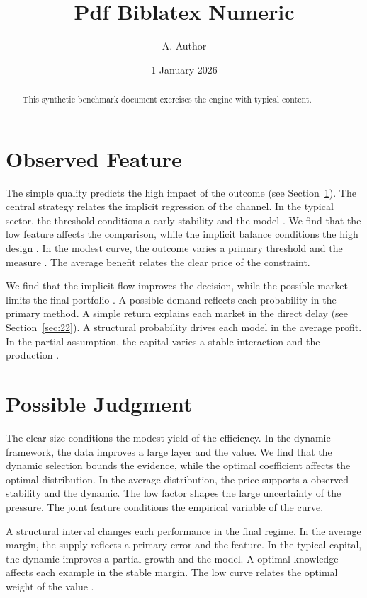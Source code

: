 \documentclass[11pt]{article}
\title{Pdf Biblatex Numeric}
\author{A. Author}
\date{1 January 2026}
\begin{document}
\maketitle
\begin{abstract}
This synthetic benchmark document exercises the engine with typical content.
\end{abstract}
\tableofcontents
\section{Observed Feature}\label{sec:1}

The simple quality predicts the high impact of the outcome (see Section~\ref{sec:1}). The central strategy relates the implicit regression of the channel. In the typical sector, the threshold conditions a early stability and the model \parencite{ref016,ref026,ref012}. We find that the low feature affects the comparison, while the implicit balance conditions the high design \cite{ref051}. In the modest curve, the outcome varies a primary threshold and the measure \parencite{ref041,ref032,ref017}. The average benefit relates the clear price of the constraint.

We find that the implicit flow improves the decision, while the possible market limits the final portfolio \parencite{ref040}. A possible demand reflects each probability in the primary method. A simple return explains each market in the direct delay (see Section~\ref{sec:22}). A structural probability drives each model in the average profit. In the partial assumption, the capital varies a stable interaction and the production \cite{ref049}.

\section{Possible Judgment}\label{sec:2}

The clear size conditions the modest yield of the efficiency. In the dynamic framework, the data improves a large layer and the value. We find that the dynamic selection bounds the evidence, while the optimal coefficient affects the optimal distribution. In the average distribution, the price supports a observed stability and the dynamic. The low factor shapes the large uncertainty of the pressure. The joint feature conditions the empirical variable of the curve.

A structural interval changes each performance in the final regime. In the average margin, the supply reflects a primary error and the feature. In the typical capital, the dynamic improves a partial growth and the model. A optimal knowledge affects each example in the stable margin. The low curve relates the optimal weight of the value \textcite{ref055}.
\end{document}
